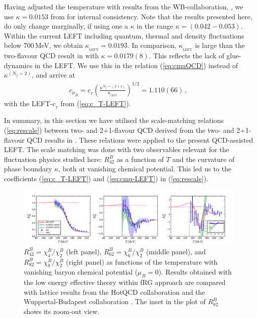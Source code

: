 \documentclass[%
reprint,
superscriptaddress,
showpacs,preprintnumbers,
amsmath,amssymb,
aps,
prd,
]{revtex4-1}
\def\eq#1{(\ref{#1})}
\begin{document}
Having adjusted the temperature with results from the WB-collaboration, \cite{Bellwied:2015rza}, we use $\kappa=0.0153$ from \cite{Borsanyi:2020fev} for internal consistency. Note that the results presented here, do only change marginally, if using one a $\kappa$ in the range $\kappa=(0.042 - 0.053)$. Within the current LEFT including quantum, thermal and density fluctuations below $700$\,MeV, we obtain $\kappa_{_\textrm{LEFT}}=0.0193$. In comparison, $\kappa_{_\textrm{LEFT}}$ is large than the two-flavour QCD result in \cite{Fu:2019hdw} with $\kappa=0.0179(8)$. This reflects the lack of glue-dynamics in the LEFT. We use this in the relation \eq{eq:cmuQCD} instead of $\kappa^{(N_f=2)}$, and arrive at  
%
\begin{align}
c_{\mu_B}=c_{_{T}}\left(\frac{\kappa^{N_f=(2+1)}}{\kappa_{_{\textrm{LEFT}}}}\right)^{1/2}=1.110(66)\,, \label{eq:cmu-LEFT}
\end{align}
%
with the LEFT-$c_{_T}$ from \eq{eq:c_T-LEFT}. 
	
In summary, in this section we have utilised the scale-matching relations \eq{eq:rescale} between two- and 2+1-flavour QCD derived from the two- and 2+1-flavour QCD results in \cite{Fu:2019hdw}. These relations were applied to the present QCD-assisted LEFT. The scale matching was done with two observables relevant for the fluctuation physics studied here: $R^{B}_{42}$ as a function of $T$ and the curvature of phase boundary $\kappa$, both at vanishing chemical potential. This led us to the coefficients \eq{eq:c_T-LEFT} and \eq{eq:cmu-LEFT} in \eq{eq:rescale}.
	

%
\begin{figure}[t]
\includegraphics[width=1\textwidth]{R42R62R82-T-muB0}
\caption{$R^{B}_{42}=\chi^{B}_{4}/\chi^{B}_{2}$ (left panel), $R^{B}_{62}=\chi^{B}_{6}/\chi^{B}_{2}$ (middle panel), and $R^{B}_{82}=\chi^{B}_{8}/\chi^{B}_{2}$ (right panel) as functions of the temperature with vanishing baryon chemical potential ($\mu_B=0$). Results obtained with the low energy effective theory within fRG approach are compared with lattice results from the HotQCD collaboration \cite{Bazavov:2017dus,Bazavov:2017tot,Bazavov:2020bjn} and the Wuppertal-Budapest collaboration \cite{Borsanyi:2018grb}. The inset in the plot of $R^{B}_{82}$ shows its zoom-out view.}\label{fig:R42R62R82-T-muB0}
\end{figure}
%		
\end{document}
